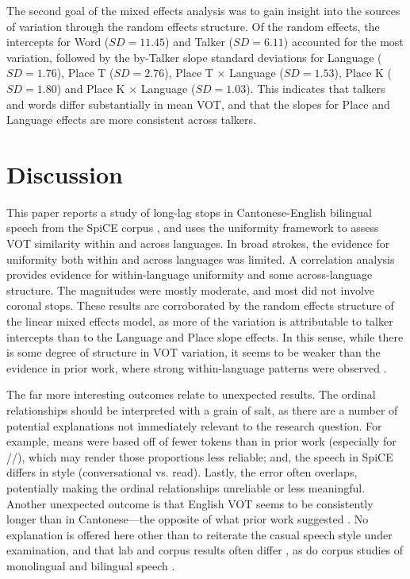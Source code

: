 The second goal of the mixed effects analysis was to gain insight into the sources of variation through the random effects structure. Of the random effects, the intercepts for Word ($SD=11.45$) and Talker ($SD=6.11$) accounted for the most variation, followed by the by-Talker slope standard deviations for Language ($SD=1.76$), Place T ($SD=2.76$), Place T $\times$ Language ($SD=1.53$), Place K ($SD=1.80$) and Place K $\times$ Language ($SD=1.03$). This indicates that talkers and words differ substantially in mean VOT, and that the slopes for Place and Language effects are more consistent across talkers.

\section{Discussion}

This paper reports a study of long-lag stops in Cantonese-English bilingual speech from the SpiCE corpus \citep{johnson_2020_spice}, and uses the uniformity framework to assess VOT similarity within and across languages. In broad strokes, the evidence for uniformity both within and across languages was limited. A correlation analysis provides evidence for within-language uniformity and some across-language structure. The magnitudes were mostly moderate, and most did not involve coronal stops. These results are corroborated by the random effects structure of the linear mixed effects model, as more of the variation is attributable to talker intercepts than to the Language and Place slope effects. In this sense, while there is some degree of structure in VOT variation, it seems to be weaker than the evidence in prior work, where strong within-language patterns were observed \citep{chodroff_2017_structure,chodroff_2019_l2}.

The far more interesting outcomes relate to unexpected results. The ordinal relationships should be interpreted with a grain of salt, as there are a number of potential explanations not immediately relevant to the research question. For example, means were based off of fewer tokens than in prior work (especially for //), which may render those proportions less reliable; and, the speech in SpiCE differs in style (conversational vs. read). Lastly, the error often overlaps, potentially making the ordinal relationships unreliable or less meaningful. Another unexpected outcome is that English VOT seems to be consistently longer than in Cantonese---the opposite of what prior work suggested \citep{clumeck_1981_cantonese,lisker_1964_vot}. No explanation is offered here other than to reiterate the casual speech style under examination, and that lab and corpus results often differ \citep{gahl_2012_reduce}, as do corpus studies of monolingual and bilingual speech \citep{johnson_2019_probabilistic}. 


